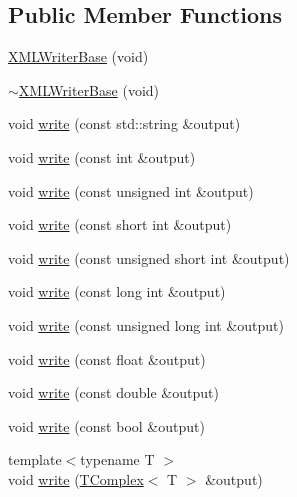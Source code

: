 \subsection*{Public Member Functions}
\begin{DoxyCompactItemize}
\item 
\mbox{\hyperlink{classXMLWriterAPI_1_1XMLWriterBase_a1620cf7f4428110d2d77b4324293512e}{X\+M\+L\+Writer\+Base}} (void)
\item 
\mbox{\hyperlink{classXMLWriterAPI_1_1XMLWriterBase_a63581e812eb79dbd0e7c8c7574fb73b4}{$\sim$\+X\+M\+L\+Writer\+Base}} (void)
\item 
void \mbox{\hyperlink{classXMLWriterAPI_1_1XMLWriterBase_abc9cd8491179aa022c9b63053f3a7ff8}{write}} (const std\+::string \&output)
\item 
void \mbox{\hyperlink{classXMLWriterAPI_1_1XMLWriterBase_a1c18e91f826057d97bb0d46b9224a830}{write}} (const int \&output)
\item 
void \mbox{\hyperlink{classXMLWriterAPI_1_1XMLWriterBase_a38ff4598155037e936a3a5473fd9d437}{write}} (const unsigned int \&output)
\item 
void \mbox{\hyperlink{classXMLWriterAPI_1_1XMLWriterBase_ac9d330a3600ca9d1ecba541e82919f09}{write}} (const short int \&output)
\item 
void \mbox{\hyperlink{classXMLWriterAPI_1_1XMLWriterBase_abea743f6c1788ff4dc2b8458a01071e0}{write}} (const unsigned short int \&output)
\item 
void \mbox{\hyperlink{classXMLWriterAPI_1_1XMLWriterBase_a84c6c305fdfee1688465eaa73740f7e7}{write}} (const long int \&output)
\item 
void \mbox{\hyperlink{classXMLWriterAPI_1_1XMLWriterBase_aa41f0c59ff0d482ee19ea2e299a9972d}{write}} (const unsigned long int \&output)
\item 
void \mbox{\hyperlink{classXMLWriterAPI_1_1XMLWriterBase_a2e56c14a785820e1f82459988b4e1dd6}{write}} (const float \&output)
\item 
void \mbox{\hyperlink{classXMLWriterAPI_1_1XMLWriterBase_a9fcb104bc58833460bfba6439d90b419}{write}} (const double \&output)
\item 
void \mbox{\hyperlink{classXMLWriterAPI_1_1XMLWriterBase_ac9c7d2ed0127b4dd05b4b3c0225d9f34}{write}} (const bool \&output)
\item 
{\footnotesize template$<$typename T $>$ }\\void \mbox{\hyperlink{classXMLWriterAPI_1_1XMLWriterBase_a00b5edcaf39f8bdaf2aa5eed7118c8e7}{write}} (\mbox{\hyperlink{classXMLTComplex_1_1TComplex}{T\+Complex}}$<$ T $>$ \&output)

\end{DoxyCompactItemize}
